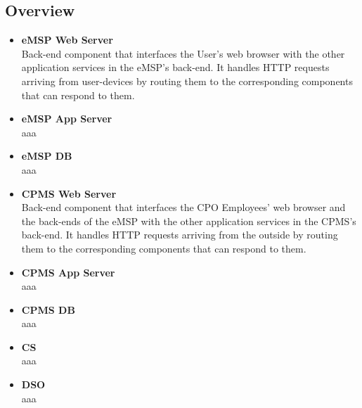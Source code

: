 \documentclass[11pt]{article}
\begin{document}





\subsection{Overview}

\begin{itemize}
    \item \textbf{eMSP Web Server} \\
        Back-end component that interfaces the User's web browser with the other application services in the eMSP's back-end. It handles HTTP requests arriving from user-devices by routing them to the corresponding components that can respond to them.
    \item \textbf{eMSP App Server} \\
        aaa
    \item \textbf{eMSP DB} \\
        aaa
    \item \textbf{CPMS Web Server} \\
        Back-end component that interfaces the CPO Employees' web browser and the back-ends of the eMSP with the other application services in the CPMS's back-end. It handles HTTP requests arriving from the outside by routing them to the corresponding components that can respond to them.
    \item \textbf{CPMS App Server} \\
        aaa
    \item \textbf{CPMS DB} \\
        aaa
    \item \textbf{CS} \\
        aaa
    \item \textbf{DSO} \\
        aaa
\end{itemize}
\end{document}

